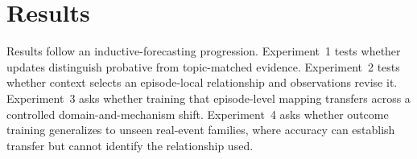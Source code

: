 \section{Results}
\label{sec:results}

Results follow an inductive-forecasting progression. Experiment~1 tests whether
updates distinguish probative from topic-matched evidence. Experiment~2 tests
whether context selects an episode-local relationship and observations revise it.
Experiment~3 asks whether training that episode-level mapping transfers across a
controlled domain-and-mechanism shift. Experiment~4 asks whether outcome training
generalizes to unseen real-event families, where accuracy can establish transfer
but cannot identify the relationship used.




